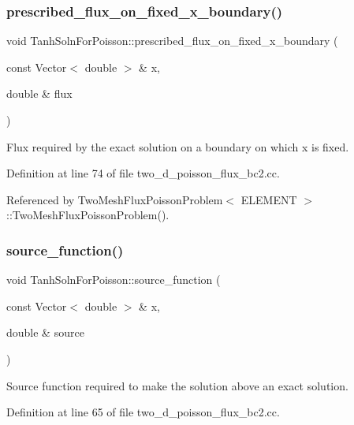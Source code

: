 \subsubsection{\texorpdfstring{prescribed\+\_\+flux\+\_\+on\+\_\+fixed\+\_\+x\+\_\+boundary()}{prescribed\_flux\_on\_fixed\_x\_boundary()}}
{\footnotesize\ttfamily void Tanh\+Soln\+For\+Poisson\+::prescribed\+\_\+flux\+\_\+on\+\_\+fixed\+\_\+x\+\_\+boundary (\begin{DoxyParamCaption}\item[{const Vector$<$ double $>$ \&}]{x,  }\item[{double \&}]{flux }\end{DoxyParamCaption})}



Flux required by the exact solution on a boundary on which x is fixed. 



Definition at line 74 of file two\+\_\+d\+\_\+poisson\+\_\+flux\+\_\+bc2.\+cc.



Referenced by Two\+Mesh\+Flux\+Poisson\+Problem$<$ E\+L\+E\+M\+E\+N\+T $>$\+::\+Two\+Mesh\+Flux\+Poisson\+Problem().

\mbox{\label{namespaceTanhSolnForPoisson_a967bc28320e02534beb714846b63e251}} 
\subsubsection{\texorpdfstring{source\+\_\+function()}{source\_function()}}
{\footnotesize\ttfamily void Tanh\+Soln\+For\+Poisson\+::source\+\_\+function (\begin{DoxyParamCaption}\item[{const Vector$<$ double $>$ \&}]{x,  }\item[{double \&}]{source }\end{DoxyParamCaption})}



Source function required to make the solution above an exact solution. 



Definition at line 65 of file two\+\_\+d\+\_\+poisson\+\_\+flux\+\_\+bc2.\+cc.



